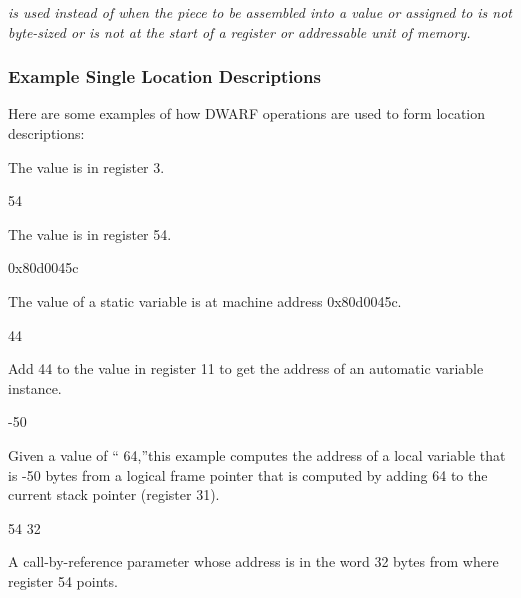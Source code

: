 \textit{ is used instead of  when
the piece to be assembled into a value or assigned to is not
byte-sized or is not at the start of a register or addressable
unit of memory.}




\subsubsection{Example Single Location Descriptions}

Here are some examples of how DWARF operations are used to form location descriptions:

\begin{myindentpara}{1cm}
The value is in register 3.
\end{myindentpara}

 54
\begin{myindentpara}{1cm}
The value is in register 54.
\end{myindentpara}

 0x80d0045c
\begin{myindentpara}{1cm}
The value of a static variable is at machine address 0x80d0045c.
\end{myindentpara}

 44
\begin{myindentpara}{1cm}
Add 44 to the value in register 11 to get the address of an automatic
variable instance.
\end{myindentpara}

 -50
\begin{myindentpara}{1cm}
Given a  value of `` 64,''this example
computes the address of a local variable that is -50 bytes from a
logical frame pointer that is computed by adding 64 to the current
stack pointer (register 31).
\end{myindentpara}

 54 32 
\begin{myindentpara}{1cm}
A call-by-reference parameter whose address is in the word 32 bytes
from where register 54 points.
\end{myindentpara}

